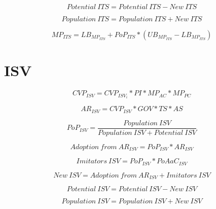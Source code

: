 \begin{equation}
	\mathit{Potential~ITS} = \mathit{Potential~ITS} - \mathit{New~ITS}
\end{equation}

\begin{equation}
	\mathit{Population~ITS} = \mathit{Population~ITS} + \mathit{New~ITS}
\end{equation}

\begin{equation}
	MP_{ITS} = LB_{MP_{ITS}} + PoP_{ITS} * (UB_{MP_{ITS}} - LB_{MP_{ITS}})
\end{equation}

\newpage
\section{ISV}

\begin{equation}
		CVP_{ISV} =  CVP_{ISV_{i}} * PI * MP_{AC} * MP_{PC}
\end{equation}

\begin{equation}
		AR_{ISV} = CVP_{ISV} * GOV * TS * AS		
\end{equation}

\begin{equation}
	PoP_{ISV} = \frac{\mathit{Population~ISV}}{\mathit{Population~ISV}+\mathit{Potential~ISV}}
\end{equation}

\begin{equation}
	\mathit{Adoption~from~AR_{ISV}} = PoP_{ISV} * AR_{ISV}
\end{equation}

\begin{equation}
	\mathit{Imitators~ISV} = PoP_{ISV} * PoAaC_{ISV}
\end{equation}

\begin{equation}
	\mathit{New~ISV} = \mathit{Adoption~from~AR_{ISV}} + \mathit{Imitators~ISV}
\end{equation}

\begin{equation}
	\mathit{Potential~ISV} = \mathit{Potential~ISV} - \mathit{New~ISV}
\end{equation}

\begin{equation}
	\mathit{Population~ISV} = \mathit{Population~ISV} + \mathit{New~ISV}
\end{equation}

